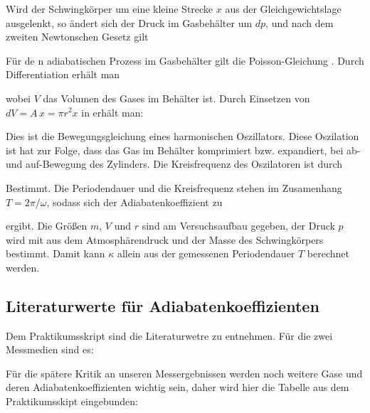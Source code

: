 Wird der Schwingkörper um eine kleine Strecke \(x\) aus der Gleichgewichtslage ausgelenkt, so ändert sich der Druck im Gasbehälter um \(dp\), und nach dem zweiten Newtonschen Gesetz gilt

Für de
n adiabatischen Prozess im Gasbehälter gilt die Poisson-Gleichung . Durch Differentiation erhält man


wobei \(V\) das Volumen des Gases im Behälter ist. Durch Einsetzen von $dV = A \, x = \pi r^2 x$ in  erhält man:


Dies ist die Bewegungsgleichung eines harmonischen Oszillators. Diese Oszilation ist hat zur Folge, dass das Gas im Behälter komprimiert bzw. expandiert, bei ab- und auf-Bewegung des Zylinders. Die Kreisfrequenz des Oszilatoren ist durch


Bestimmt. Die Periodendauer und die Kreisfrequenz stehen im Zusamenhang \(T = 2\pi / \omega\), sodass sich der Adiabatenkoeffizient zu


ergibt. Die Größen \(m\), \(V\) und \(r\) sind am Versuchsaufbau gegeben, der Druck \(p\) wird mit  aus dem Atmosphärendruck und der Masse des Schwingkörpers bestimmt. Damit kann \(\kappa\) allein aus der gemessenen Periodendauer \(T\) berechnet werden.

\subsection{Literaturwerte für Adiabatenkoeffizienten}
Dem Praktikumsskript sind die Literaturwetre zu entnehmen. Für die zwei Messmedien sind es:



Für die spätere Kritik an unseren Messergebnissen werden noch weitere Gase und deren Adiabatenkoeffizienten wichtig sein, daher wird hier die Tabelle aus dem Praktikumsskipt eingebunden:

